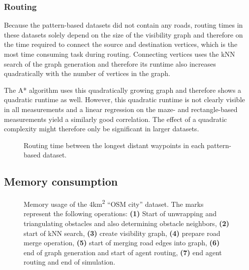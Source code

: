 		\subsubsection{Routing}
		
			Because the pattern-based datasets did not contain any roads, routing times in these datasets solely depend on the size of the visibility graph and therefore on the time required to connect the source and destination vertices, which is the most time consuming task during routing.
			Connecting vertices uses the kNN search of the graph generation and therefore its runtime also increases quadratically with the number of vertices in the graph.
			
			The A* algorithm uses this quadratically growing graph and therefore shows a quadratic runtime as well.
			However, this quadratic runtime is not clearly visible in all measurements and a linear regression on the maze- and rectangle-based measurements yield a similarly good correlation.
			The effect of a quadratic complexity might therefore only be significant in larger datasets.
			
			\begin{figure}[h!]
				\hspace{-20pt}
				
				\caption{Routing time between the longest distant waypoints in each pattern-based dataset.}
				\label{fig:eval-pattern-routing-details}
			\end{figure}
			
	\subsection{Memory consumption}
	\label{subsec:memory-consumption}
	
		\begin{figure}[h]
			\begin{figcenter}
				
			\end{figcenter}
			\caption[Memory usage of the 4km\textsuperscript{2} \enquote{OSM city} dataset]{Memory usage of the 4km\textsuperscript{2} \enquote{OSM city} dataset. The marks represent the following operations: \textbf{(1)} Start of unwrapping and triangulating obstacles and also determining obstacle neighbors, \textbf{(2)} start of kNN search, \textbf{(3)} create visibility graph, \textbf{(4)} prepare road merge operation, \textbf{(5)} start of merging road edges into graph, \textbf{(6)} end of graph generation and start of agent routing, \textbf{(7)} end agent routing and end of simulation.}
			\label{fig:eval-memory-usage}
		\end{figure}
	
